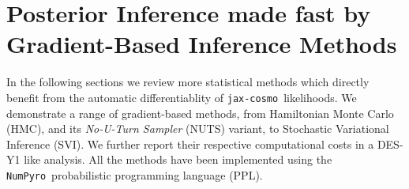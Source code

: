 \documentclass[twocolumn,twocolappendix,nofootinbib,iop]{openjournal}
\newcommand{\numpyro}{\texttt{NumPyro}}
\newcommand{\jaxcosmo}{\texttt{jax-cosmo}}
\begin{document}
%
\section{Posterior Inference made fast by Gradient-Based Inference Methods}
\label{sec:chmc}
%
In the following sections we review more statistical methods which directly benefit from the automatic differentiablity of \jaxcosmo\ likelihoods. We demonstrate a range of gradient-based methods, from Hamiltonian Monte Carlo (HMC), and its \textit{No-U-Turn Sampler} (NUTS) variant, to Stochastic Variational Inference (SVI). We further report their respective computational costs in a DES-Y1 like analysis. All  the methods have been implemented using the \numpyro\ probabilistic programming language (PPL). 
%
%
%
\end{document}
